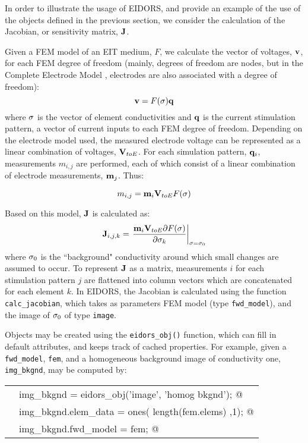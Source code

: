 \documentclass[12pt]{iopart}
\makeatletter
\newcommand{\CODEstart}{\medskip\begin{tabular}{ll}}
\newcommand{\CN}{\tt\scriptsize} %
\newcommand{\CC}{&\small\verb@}   % start code
\newcommand{\CODEend}{\end{tabular}\medskip}
\makeatother
\begin{document}
In order to illustrate the usage of EIDORS, and provide
an example of the use of the objects defined in the previous
section, we consider
the calculation of the Jacobian, or sensitivity matrix,
$\bf J$.

Given a FEM  model of an EIT medium,
$F$, we calculate the vector of voltages, $\bf v$, 
for each FEM degree of freedom
 (mainly, degrees of freedom are nodes, but in the
 Complete Electrode Model \cite{Cheng_etal_1989},
 electrodes are also associated
 with a degree of freedom):
\begin{equation}
{\bf v} = F({\bf \sigma}){\bf q} 
\end{equation}
where $\bf \sigma$ is the vector of element conductivities
and $\bf q$ is the current stimulation pattern, a vector
of current inputs to each FEM degree of freedom.
Depending on the electrode model used, the measured electrode
voltage can be represented as a linear combination of 
voltages, ${\bf V}_{toE}$.
For each simulation pattern, ${\bf q}_{i}$,
measurements $m_{i,j}$
are performed, each of which consist of a linear combination of
electrode measurements, ${\bf m}_j$.
Thus:

\begin{equation}
m_{i,j} = {\bf m}_{i} {\bf V}_{toE} F({\bf \sigma})
\end{equation}

Based on this model, $\bf J$ is calculated as:
\begin{equation}
{\bf J}_{i,j,k} = \left.\frac{
 {\bf m}_{i} {\bf V}_{toE}{\partial}F({\bf \sigma})
}{
{\partial}{\bf \sigma}_k
}
\right|_{
   {\bf \sigma} = {\bf \sigma}_0 
}
\end{equation}
where ${\bf \sigma}_0$ is the ``background"
conductivity around which small changes are assumed to occur.
To represent $\bf J$ as a matrix, measurements $i$ for each stimulation
pattern $j$ are flattened into column vectors which are concatenated
for each element $k$.
In EIDORS, the Jacobian is calculated using the function
{\tt calc\_jacobian},
which takes as parameters FEM model (type {\tt fwd\_model}),
and the image of ${\bf \sigma}_0$ 
of type {\tt image}.

Objects may be created using the {\tt eidors\_obj()}
function, which can fill in default attributes, and 
keeps track of cached properties.
For example, given a {\tt fwd\_model}, {\tt fem}, and
a homogeneous background image of conductivity one,
{\tt img\_bkgnd}, may be computed by:

\CODEstart
\CN    \CC img_bkgnd           = eidors_obj('image', 'homog bkgnd'); @\\[-3pt]
\CN    \CC img_bkgnd.elem_data = ones( length(fem.elems) ,1); @\\[-3pt]
\CN    \CC img_bkgnd.fwd_model = fem; @\\[-3pt]
\CODEend
\end{document}
